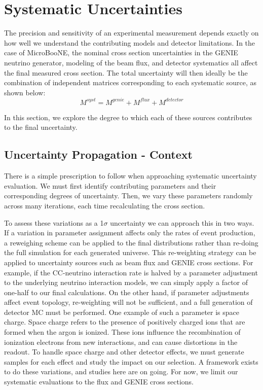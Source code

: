 \section{Systematic Uncertainties}
The precision and sensitivity of an experimental measurement depends exactly on how well we understand the contributing models and detector limitations. In the case of MicroBooNE, the nominal cross section uncertainties in the GENIE neutrino generator, modeling of the beam flux, and detector systematics all affect the final measured cross section. The total uncertainty will then ideally be the combination of independent matrices corresponding to each systematic source, as shown below:
\begin{equation}
\label{eq:sys_error}
M^{syst} =  M^{genie} + M^{flux} + M^{detector}
\end{equation}

\noindent In this section, we explore the degree to which each of these sources contributes to the final uncertainty. 
\subsection{Uncertainty Propagation - Context} 
There is a simple prescription to follow when approaching systematic uncertainty evaluation. We must first identify contributing parameters and their corresponding degrees of uncertainty.  Then, we vary these parameters randomly across many iterations, each time recalculating the cross section.
\par To assess these variations as a 1$\sigma$ uncertainty we can approach this in two ways. If a variation in parameter assignment affects only the rates of event production, a reweighing scheme can be applied to the final distributions rather than re-doing the full simulation for each generated universe.  This re-weighting strategy can be applied to uncertainty sources such as beam flux and GENIE cross sections.  For example, if the CC-neutrino interaction rate is halved by a parameter adjustment to the underlying neutrino interaction models, we can simply apply a factor of one-half to our final calculations.  On the other hand, if parameter adjustments affect event topology, re-weighting will not be sufficient, and a full generation of detector MC must be performed. One example of such a parameter is space charge. Space charge refers to the presence of positively charged ions that are formed when the argon is ionized.  These ions influence the recombination of ionization electrons from new interactions, and can cause distortions in the readout. To handle space charge and other detector effects, we must generate samples for each effect and study the impact on our selection. A framework exists to do these variations, and studies here are on going. For now, we limit our systematic evaluations to the flux and GENIE cross sections.

